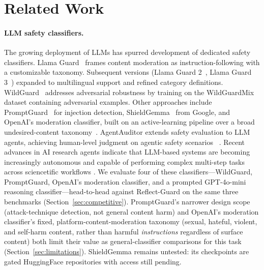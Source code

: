 \documentclass[Superintelligence,article,submit,pdftex,moreauthors]{Definitions/mdpi}
\begin{document}
\section{Related Work}

\paragraph{LLM safety classifiers.}
The growing deployment of LLMs has spurred development of dedicated safety classifiers. Llama Guard~\citep{inan2023llamaguard} frames content moderation as instruction-following with a customizable taxonomy. Subsequent versions (Llama Guard 2~\citep{metallamaguard2}, Llama Guard 3~\citep{metallamaguard3}) expanded to multilingual support and refined category definitions. WildGuard~\citep{han2024wildguard} addresses adversarial robustness by training on the WildGuardMix dataset containing adversarial examples. Other approaches include PromptGuard~\citep{meta2024promptguard} for injection detection, ShieldGemma~\citep{zeng2024shieldgemma} from Google, and OpenAI's moderation classifier, built on an active-learning pipeline over a broad undesired-content taxonomy~\citep{markov2023holistic}. AgentAuditor extends safety evaluation to LLM agents, achieving human-level judgment on agentic safety scenarios ~\citep{luo2025agentauditor}. Recent advances in AI research agents indicate that LLM-based systems are becoming increasingly autonomous and capable of performing complex multi-step tasks across sciencetific workflows \citep{kong2026aiautoresearch}. We evaluate four of these classifiers---WildGuard, PromptGuard, OpenAI's moderation classifier, and a prompted GPT-4o-mini reasoning classifier---head-to-head against Reflect-Guard on the same three benchmarks (Section~\ref{sec:competitive}). PromptGuard's narrower design scope (attack-technique detection, not general content harm) and OpenAI's moderation classifier's fixed, platform-content-moderation taxonomy (sexual, hateful, violent, and self-harm content, rather than harmful \emph{instructions} regardless of surface content) both limit their value as general-classifier comparisons for this task (Section~\ref{sec:limitations}). ShieldGemma remains untested: its checkpoints are gated HuggingFace repositories with access still pending.
\end{document}

